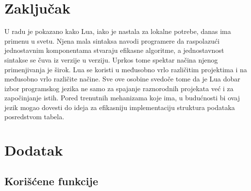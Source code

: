 \documentclass[a4paper]{article}
\begin{document}
\section{Zaključak}
\label{sec:zakljucak}

U radu je pokazano kako Lua, iako je nastala za lokalne potrebe, danas ima primenu u svetu. Njena mala sintaksa navodi programere da raspolazući jednostavnim komponentama stvaraju efikasne algoritme, a jednostavnost sintakse se čuva iz verzije u verziju. Uprkos tome spektar načina njenog primenjivanja je širok. Lua se koristi u međusobno vrlo različitim projektima i na međusobno vrlo različite načine. Sve ove osobine svedoče tome da je Lua dobar izbor programskog jezika ne samo za spajanje raznorodnih projekata već i za započinjanje istih. Pored trenutnih mehanizama koje ima, u budućnosti bi ovaj jezik mogao dovesti do ideja za efikasniju implementaciju struktura podataka posredstvom tabela.

\appendix
 


\appendix
\section{Dodatak}
\subsection{Korišćene funkcije}
\label{dodaci}
\end{document}
